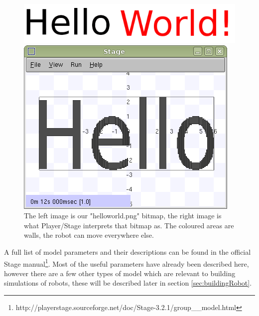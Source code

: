 \documentclass[a4paper]{report}
\newcommand{\plst}{Player/Stage\xspace}
\begin{document}
\begin{figure}
	\centering
	\begin{minipage}[c]{0.4\linewidth}
		\centering
		\includegraphics[width=\linewidth]{./pics/empty_world/writing.png}
		
	\end{minipage}%
	\hspace{0.05\linewidth}
	\begin{minipage}[c]{0.5\linewidth}
		\centering
		\includegraphics[width=\linewidth]{./pics/empty_world/helloworld.png} 
	\end{minipage}	
	\caption{The left image is our "helloworld.png" bitmap, the right image is what \plst interprets that bitmap as. The coloured areas are walls, the robot can move everywhere else.}
		\label{fig:helloWorldBitmap}
\end{figure}

A full list of model parameters and their descriptions can be found in the official Stage manual\footnote{http://playerstage.sourceforge.net/doc/Stage-3.2.1/group\_\_model.html}. Most of the useful parameters have already been described here, however there are a few other types of model which are relevant to building simulations of robots, these will be described later in section \ref{sec:buildingRobot}.
\end{document}
